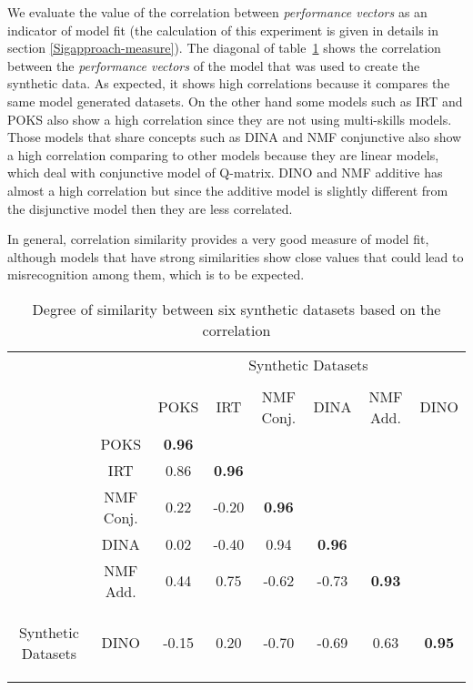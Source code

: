 We evaluate the value of the correlation between \textit{performance vectors} as an indicator of model fit (the calculation of this experiment is given in details in section \ref{Sigapproach-measure}). The diagonal of table~\ref{tablSyn} shows the correlation between the \textit{performance vectors} of the model that was used to create the synthetic data. As expected, it shows high correlations because it compares the same model generated datasets. On the other hand some models such as IRT and POKS also show a high correlation since they are not using multi-skills models. Those models that share concepts such as DINA and NMF conjunctive also show a high correlation comparing to other models because they are linear models, which deal with conjunctive model of Q-matrix. DINO and NMF additive has almost a high correlation but since the additive model is slightly different from the disjunctive model then they are less correlated.

In general, correlation similarity provides a very good measure of model fit, although models that have strong similarities show close values that could lead to misrecognition among them, which is to be expected.

\begin{table}[h]
\center
\begin{tabular}{c|c|c|c|c|c|c|c|}
\multicolumn{2}{c}{} & \multicolumn{6}{c}{Synthetic Datasets} \tabularnewline
\multicolumn{8}{c}{} \tabularnewline
\cline{3-8} 
\multicolumn{2}{c|}{} & POKS & IRT & NMF Conj. & DINA & NMF Add. & DINO\tabularnewline
\cline{2-8}
\cline{2-3}
&POKS & \textbf {0.96} & \multicolumn{1}{|c}{} & \multicolumn{1}{c}{} & \multicolumn{1}{c}{} & \multicolumn{1}{c}{}\tabularnewline
\cline{2-4}
&IRT & 0.86 & \textbf {0.96} & \multicolumn{1}{|c}{} & \multicolumn{1}{c}{} & \multicolumn{1}{c}{} & \multicolumn{1}{c}{}\tabularnewline
\cline{2-5}
&NMF Conj. & 0.22 & -0.20 & \textbf {0.96} & \multicolumn{1}{|c}{} & \multicolumn{1}{c}{} & \multicolumn{1}{c}{}\tabularnewline
\cline{2-6}
&DINA & 0.02 & -0.40 & 0.94 & \textbf {0.96} & \multicolumn{1}{|c}{} & \multicolumn{1}{c}{}\tabularnewline
\cline{2-7}
&NMF Add. & 0.44 & 0.75 & -0.62 & -0.73 & \textbf {0.93} & \multicolumn{1}{|c}{}\tabularnewline
\cline{2-8}
\multicolumn{1}{c|}{\multirow{-6}{*}{\begin{sideways}Synthetic Datasets\end{sideways}}}&DINO & -0.15 & 0.20 & -0.70 & -0.69 & 0.63 & \textbf {0.95}\tabularnewline
\cline{2-8}
\end{tabular}
\caption{Degree of similarity between six synthetic datasets based on the correlation}
\label{tablSyn}
\end{table}


